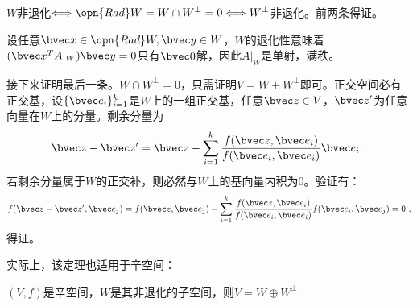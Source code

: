 $W$非退化$\Longleftrightarrow \opn{Rad}W=W\cap W^{\bot}=0\Longleftrightarrow  W^{\bot}$非退化。前两条得证。

设任意$\bvec x\in \opn{Rad} W,\bvec y\in W$，$W$的退化性意味着$(\bvec x^{T}A|_{W})\bvec  y=0$只有$\bvec 0$解，因此$A|_{W}$是单射，满秩。

接下来证明最后一条。$W\cap W^{\bot}=0$，只需证明$V=W+W^{\bot}$即可。正交空间必有正交基，设$\{\bvec e_i\}_{i=1}^k$是$W$上的一组正交基，任意$\bvec z\in V$，$\bvec z'$为任意向量在$W$上的分量。剩余分量为
\begin{equation}
\bvec z-\bvec z'=\bvec z-\sum\limits_{i=1}^k\frac{f(\bvec z,\bvec e_i)}{f(\bvec e_i,\bvec e_i)}\bvec e_i~.
\end{equation}
若剩余分量属于$W$的正交补，则必然与$W$上的基向量内积为$0$。验证有：
\begin{equation}
f(\bvec z-\bvec z',\bvec e_j)=f(\bvec z,\bvec e_j)-\sum\limits_{i=1}^k\frac{f(\bvec z,\bvec e_i)}{f(\bvec e_i,\bvec e_i)}f(\bvec e_i,\bvec e_j)=0~,
\end{equation}
得证。

实际上，该定理也适用于辛空间：
\begin{theorem}{}
$(V,f)$是辛空间，$W$是其非退化的子空间，则$V=W\oplus W^{\bot}$
\end{theorem}

